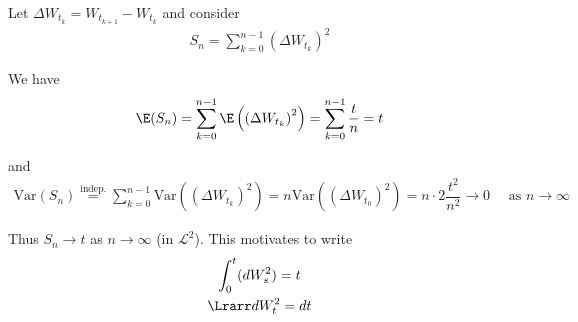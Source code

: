 \noindent Let $\Delta W_{t_k} = W_{t_{k+1}}-W_{t_k}$ and consider
\begin{equation*}
  \begin{gathered}
    S_n = \sum_{k=0}^{n-1} \left(\Delta W_{t_k}\right)^2
  \end{gathered}
\end{equation*}\par
\noindent We have 
\begin{equation*}
  \begin{gathered}
    \E(S_n) = \sum_{k=0}^{n-1}\E\left(\left(\Delta W_{t_k}\right)^2\right) = \sum_{k=0}^{n-1}\dfrac{t}{n} = t
  \end{gathered}
\end{equation*}\par
\noindent and
\begin{equation*}
  \begin{gathered}
    \text{Var}\left(S_n\right) \stackrel{\text{indep.}}{=} \sum_{k=0}^{n-1}\text{Var}\left(\left(\Delta W_{t_k}\right)^2\right) = n\text{Var}\left(\left(\Delta W_{t_0}\right)^2\right) = n\cdot2\dfrac{t^2}{n^2}\to0\quad\text{ as } n\to\infty
  \end{gathered}
\end{equation*}\par
\noindent Thus $S_n\to t$ as $n\to\infty$ (in $\mathcal{L}^2$). This motivates to write
\begin{equation*}
  \begin{gathered}
    \int_{0}^{t}(dW_s^2) = t\\
    \Lrarr dW_t^2 = dt
  \end{gathered}
\end{equation*}
